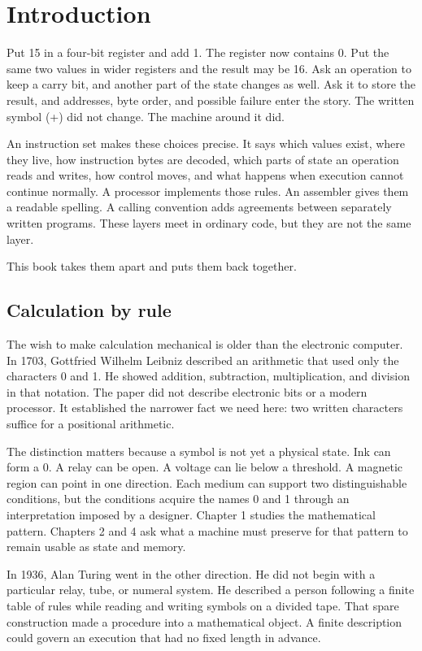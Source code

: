 \chapter{Introduction}
\label{ch:introduction}

Put 15 in a four-bit register and add 1. The register now contains 0. Put the
same two values in wider registers and the result may be 16. Ask an operation
to keep a carry bit, and another part of the state changes as well. Ask it to
store the result, and addresses, byte order, and possible failure enter the
story. The written symbol (+) did not change. The machine around it did.

An instruction set makes these choices precise. It says which values exist,
where they live, how instruction bytes are decoded, which parts of state an
operation reads and writes, how control moves, and what happens when execution
cannot continue normally. A processor implements those rules. An assembler
gives them a readable spelling. A calling convention adds agreements between
separately written programs. These layers meet in ordinary code, but they are
not the same layer.

This book takes them apart and puts them back together.

\section{Calculation by rule}

The wish to make calculation mechanical is older than the electronic
computer. In 1703, Gottfried Wilhelm Leibniz described an arithmetic that used
only the characters 0 and 1. He showed addition, subtraction, multiplication,
and division in that notation. The paper did not describe electronic bits or a
modern processor. It established the narrower fact we need here: two written
characters suffice for a positional arithmetic.
\autocite{leibniz1703binary}

The distinction matters because a symbol is not yet a physical state. Ink can
form a 0. A relay can be open. A voltage can lie below a threshold. A magnetic
region can point in one direction. Each medium can support two distinguishable
conditions, but the conditions acquire the names 0 and 1 through an
interpretation imposed by a designer. Chapter 1 studies the mathematical
pattern. Chapters 2 and 4 ask what a machine must preserve for that pattern to
remain usable as state and memory.

In 1936, Alan Turing went in the other direction. He did not begin with a
particular relay, tube, or numeral system. He described a person following a
finite table of rules while reading and writing symbols on a divided tape.
That spare construction made a procedure into a mathematical object. A finite
description could govern an execution that had no fixed length in advance.
\autocite{turing1936computable}

